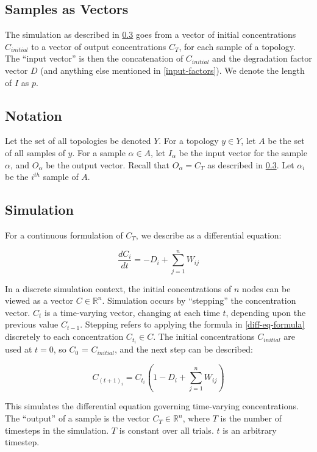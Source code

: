 \documentclass{article}
\begin{document}
\subsection{Samples as Vectors}
The simulation as described in \ref{simulation} goes from a vector of initial concentrations $C_{initial}$ to a vector of output concentrations $C_T$, for each sample of a topology. The ``input vector'' is then the concatenation of $C_{initial}$ and the degradation factor vector $D$ (and anything else mentioned in \ref{input-factors}). We denote the length of $I$ as $p$.

\subsection{Notation}

Let the set of all topologies be denoted $Y$. For a topology $y \in Y$, let $A$ be the set of all samples of $y$. For a sample $\alpha \in A$, let $I_{\alpha}$ be the input vector for the sample $\alpha$, and $O_{\alpha}$ be the output vector. Recall that $O_{\alpha} = C_T$ as described in \ref{simulation}. Let $\alpha_i$ be the $i^{th}$ sample of $A$.

\subsection{Simulation} \label{simulation}
For a continuous formulation of $C_T$, we describe as a differential equation:

\begin{equation} \label{diff-eq-formula}
  \frac{dC_i}{dt} = - D_i + \sum_{j = 1}^n{W_{ij}}
\end{equation}

In a discrete simulation context, the initial concentrations of $n$ nodes can be viewed as a vector $C \in \mathbb{R}^n$. Simulation occurs by ``stepping'' the concentration vector. $C_t$ is a time-varying vector, changing at each time $t$, depending upon the previous value $C_{t - 1}$. Stepping refers to applying the formula in \eqref{diff-eq-formula} discretely to each concentration $C_{t_i} \in C$. The initial concentrations $C_{initial}$ are used at $t = 0$, so $C_0$ = $C_{initial}$, and the next step can be described:

\begin{equation} \label{timestep-formula}
  C_{{(t + 1)}_i} = C_{t_i} (1 - D_i + \sum_{j = 1}^n{W_{ij}})
\end{equation}

This simulates the differential equation governing time-varying concentrations. The ``output'' of a sample is the vector $C_T \in \mathbb{R}^n$, where $T$ is the number of timesteps in the simulation. $T$ is constant over all trials. $t$ is an arbitrary timestep.
\end{document}
